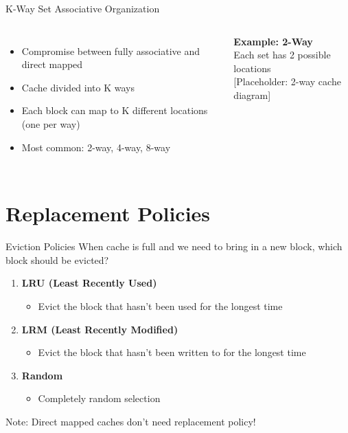 \documentclass[aspectratio=169,12pt]{beamer}
\begin{document}
\begin{frame}{K-Way Set Associative Organization}
\begin{columns}
\begin{itemize}
    \item Compromise between fully associative and direct mapped
    \item Cache divided into K ways
    \item Each block can map to K different locations (one per way)
    \item Most common: 2-way, 4-way, 8-way
\end{itemize}

\begin{tcolorbox}[colback=gray!10]
\textbf{Example: 2-Way}\\
Each set has 2 possible locations\\
\vspace{0.3cm}
[Placeholder: 2-way cache diagram]
\end{tcolorbox}
\end{columns}
\end{frame}

\section{Replacement Policies}
\begin{frame}{Eviction Policies}
When cache is full and we need to bring in a new block, which block should be evicted?

\begin{enumerate}
    \item \textbf{LRU (Least Recently Used)}
    \begin{itemize}
        \item Evict the block that hasn't been used for the longest time
    \end{itemize}
    
    \item \textbf{LRM (Least Recently Modified)}
    \begin{itemize}
        \item Evict the block that hasn't been written to for the longest time
    \end{itemize}
    
    \item \textbf{Random}
    \begin{itemize}
        \item Completely random selection
    \end{itemize}
\end{enumerate}

Note: Direct mapped caches don't need replacement policy!
\end{frame}
\end{document}
